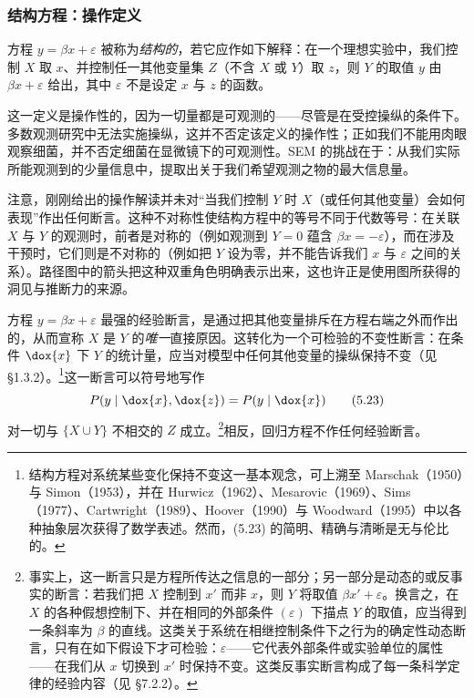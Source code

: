 \subsubsection*{结构方程：操作定义}

\begin{definition}[结构方程]
方程 $y=\beta x+\varepsilon$ 被称为\emph{结构的}，若它应作如下解释：在一个理想实验中，我们控制 $X$ 取 $x$、并控制任一其他变量集 $Z$（不含 $X$ 或 $Y$）取 $z$，则 $Y$ 的取值 $y$ 由 $\beta x+\varepsilon$ 给出，其中 $\varepsilon$ 不是设定 $x$ 与 $z$ 的函数。
\end{definition}

这一定义是操作性的，因为一切量都是可观测的——尽管是在受控操纵的条件下。多数观测研究中无法实施操纵，这并不否定该定义的操作性；正如我们不能用肉眼观察细菌，并不否定细菌在显微镜下的可观测性。SEM 的挑战在于：从我们实际所能观测到的少量信息中，提取出关于我们希望观测之物的最大信息量。

注意，刚刚给出的操作解读并未对“当我们控制 $Y$ 时 $X$（或任何其他变量）会如何表现”作出任何断言。这种不对称性使结构方程中的等号不同于代数等号：在关联 $X$ 与 $Y$ 的观测时，前者是对称的（例如观测到 $Y=0$ 蕴含 $\beta x=-\varepsilon$），而在涉及干预时，它们则是不对称的（例如把 $Y$ 设为零，并不能告诉我们 $x$ 与 $\varepsilon$ 之间的关系）。路径图中的箭头把这种双重角色明确表示出来，这也许正是使用图所获得的洞见与推断力的来源。

方程 $y=\beta x+\varepsilon$ 最强的经验断言，是通过把其他变量排斥在方程右端之外而作出的，从而宣称 $X$ 是 $Y$ 的\emph{唯一}直接原因。这转化为一个可检验的不变性断言：在条件 $\dox{x}$ 下 $Y$ 的统计量，应当对模型中任何其他变量的操纵保持不变（见 \S 1.3.2）。\footnote{结构方程对系统某些变化保持不变这一基本观念，可上溯至 Marschak（1950）与 Simon（1953），并在 Hurwicz（1962）、Mesarovic（1969）、Sims（1977）、Cartwright（1989）、Hoover（1990）与 Woodward（1995）中以各种抽象层次获得了数学表述。然而，\textup{(5.23)} 的简明、精确与清晰是无与伦比的。}这一断言可以符号地写作
\begin{equation}
P(y\mid \dox{x},\dox{z})=P(y\mid \dox{x}) \tag{5.23}
\end{equation}
对一切与 $\{X\cup Y\}$ 不相交的 $Z$ 成立。\footnote{事实上，这一断言只是方程所传达之信息的一部分；另一部分是动态的或反事实的断言：若我们把 $X$ 控制到 $x'$ 而非 $x$，则 $Y$ 将取值 $\beta x'+\varepsilon$。换言之，在 $X$ 的各种假想控制下、并在相同的外部条件 $(\varepsilon)$ 下描点 $Y$ 的取值，应当得到一条斜率为 $\beta$ 的直线。这类关于系统在相继控制条件下之行为的确定性动态断言，只有在如下假设下才可检验：$\varepsilon$——它代表外部条件或实验单位的属性——在我们从 $x$ 切换到 $x'$ 时保持不变。这类反事实断言构成了每一条科学定律的经验内容（见 \S 7.2.2）。}相反，回归方程不作任何经验断言。

